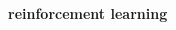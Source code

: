 \documentclass[xcolor=dvipsnames]{beamer}
\begin{document}
\begin{frame}{\bf reinforcement learning}

  \begin{columns}

    \begin{column}{0.5\textwidth}
    \end{column}


\end{columns}
\end{frame}
\end{document}
